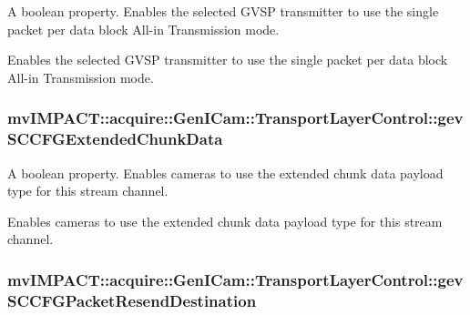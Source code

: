 A boolean property. Enables the selected G\+V\+S\+P transmitter to use the single packet per data block All-\/in Transmission mode. 

Enables the selected G\+V\+S\+P transmitter to use the single packet per data block All-\/in Transmission mode. \hypertarget{classmv_i_m_p_a_c_t_1_1acquire_1_1_gen_i_cam_1_1_transport_layer_control_a0c233249933f16f0d9c9e1e08ce704c2}{
\subsubsection[{gev\+S\+C\+C\+F\+G\+Extended\+Chunk\+Data}]{ mv\+I\+M\+P\+A\+C\+T\+::acquire\+::\+Gen\+I\+Cam\+::\+Transport\+Layer\+Control\+::gev\+S\+C\+C\+F\+G\+Extended\+Chunk\+Data}}\label{classmv_i_m_p_a_c_t_1_1acquire_1_1_gen_i_cam_1_1_transport_layer_control_a0c233249933f16f0d9c9e1e08ce704c2}


A boolean property. Enables cameras to use the extended chunk data payload type for this stream channel. 

Enables cameras to use the extended chunk data payload type for this stream channel. \hypertarget{classmv_i_m_p_a_c_t_1_1acquire_1_1_gen_i_cam_1_1_transport_layer_control_ace3aea59f2f09120252fa4161685a970}{
\subsubsection[{gev\+S\+C\+C\+F\+G\+Packet\+Resend\+Destination}]{ mv\+I\+M\+P\+A\+C\+T\+::acquire\+::\+Gen\+I\+Cam\+::\+Transport\+Layer\+Control\+::gev\+S\+C\+C\+F\+G\+Packet\+Resend\+Destination}}\label{classmv_i_m_p_a_c_t_1_1acquire_1_1_gen_i_cam_1_1_transport_layer_control_ace3aea59f2f09120252fa4161685a970}


